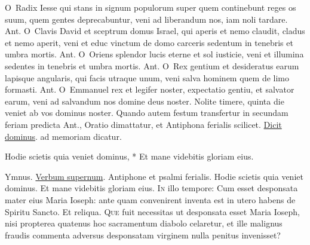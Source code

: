 \begin{multicols*}{2}
\lettrine[lines=2]{\zallmancaps \color{Red} O}{}\ Radix Iesse qui stans in signum populorum super quem continebunt reges os suum, quem gentes deprecabuntur, veni ad liberandum nos, iam noli tardare. {\color{Red} Ant.}
\lettrine[lines=2]{\zallmancaps \color{Blue} O}{}\ Clavis David et sceptrum domus Israel, qui aperis et nemo claudit, cladus et nemo aperit, veni et educ vinctum de domo carceris sedentum in tenebris et umbra mortis. {\color{Red} Ant.}
\lettrine[lines=2]{\zallmancaps \color{Red} O}{}\ Oriens splendor lucis eterne et sol iusticie, veni et illumina sedentes in tenebris et umbra mortis. {\color{Red} Ant.}
\lettrine[lines=2]{\zallmancaps \color{Blue} O}{}\ Rex gentium et desideratus earum lapisque angularis, qui facis utraque unum, veni salva hominem quem de limo formasti. {\color{Red} Ant.}
\lettrine[lines=2]{\zallmancaps \color{Red} O}{}\ Emmanuel rex et legifer noster, expectatio gentiu, et salvator earum, veni ad salvandum nos domine deus noster.
 Nolite timere, quinta die veniet ab vos dominus noster.
\newline Quando autem festum transfertur in secundam feriam predicta Ant., Oratio dimattatur, et Antiphona ferialis scilicet. \hyperlink{ant-dicit-dominus}{Dicit dominus}. ad memoriam dicatur.
{\color{Red} }
\par {}
\begin{invitatory}
{Hodie scietis quia veniet dominus, * Et mane videbitis gloriam eius.}
\end{invitatory}
{\color{Red} Ymnus.} \hyperlink{verbum}{Verbum supernum}. Antiphone et psalmi ferialis. \V Hodie scietis quia veniet dominus. \R Et mane videbitis gloriam eius.
\lettrine[lines=2]{\zallmancaps \color{Blue} I}{n} illo tempore: Cum esset desponsata mater eius Maria Ioseph: ante quam convenirent inventa est in utero habens de Spiritu Sancto. Et reliqua.
\lettrine[lines=2]{\zallmancaps \color{Red} Q}{ue} fuit necessitas ut desponsata esset Maria Ioseph, nisi propterea quatenus hoc sacramentum diabolo celaretur, et ille malignus fraudis commenta adversus desponsatam virginem nulla penitus invenisset?

\end{multicols*}
